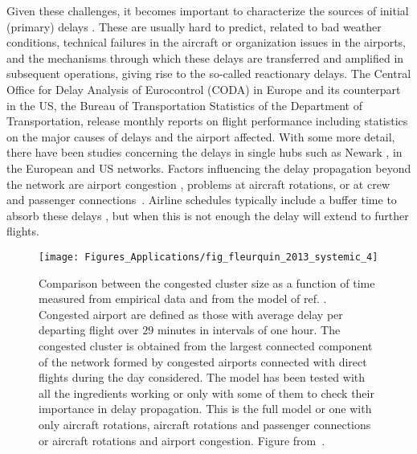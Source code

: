 Given these challenges, it becomes important to characterize the sources of initial (primary) delays \cite{rupp_2007_further,ahmadbeygi_2008_analysis}. These are usually hard to predict, related to bad weather conditions, technical failures in the aircraft or organization issues in the airports, and the mechanisms through which these delays are transferred and amplified in subsequent operations, giving rise to the so-called reactionary delays. The Central Office for Delay Analysis of Eurocontrol (CODA) in Europe and its counterpart in the US, the Bureau of Transportation Statistics of the Department of Transportation, release monthly reports on flight performance including statistics on the major causes of delays and the airport affected. With some more detail, there have been studies concerning the delays in single hubs such as Newark \cite{allan_2001_analysis}, in the European \cite{cook_2007_european,jetzki_2009_propagation} and US \cite{mayer_2003_network,churchill_2007_examining,fleurquin_2014_trees} networks. Factors influencing the delay propagation beyond the network are airport congestion \cite{bonnefoy_2007_scalability}, problems at aircraft rotations, or at crew and passenger connections~\cite{beatty_1998_preliminary,wang_2003_flight}. Airline schedules typically include a buffer time to absorb these delays \cite{wu_2000_aircraft}, but when this is not enough the delay will extend to further flights. 


\begin{figure}
\centering
\texttt{[image: Figures\_Applications/fig\_fleurquin\_2013\_systemic\_4]}
\caption{Comparison between the congested cluster size as a function of time measured from empirical data and from the model of ref. \cite{fleurquin_2013_systemic}. Congested airport are defined as those with average delay per departing flight over $29$ minutes in intervals of one hour. The congested cluster is obtained from the largest connected component of the network formed by congested airports connected with direct flights during the day considered. The model has been tested with all the ingredients working or only with some of them to check their importance in delay propagation. This is the full model or one with only aircraft rotations, aircraft rotations and passenger connections or aircraft rotations and airport congestion. Figure from~\cite{fleurquin_2013_systemic}. \label{fig:fleurquin_2013_systemic_4}}
\end{figure}


